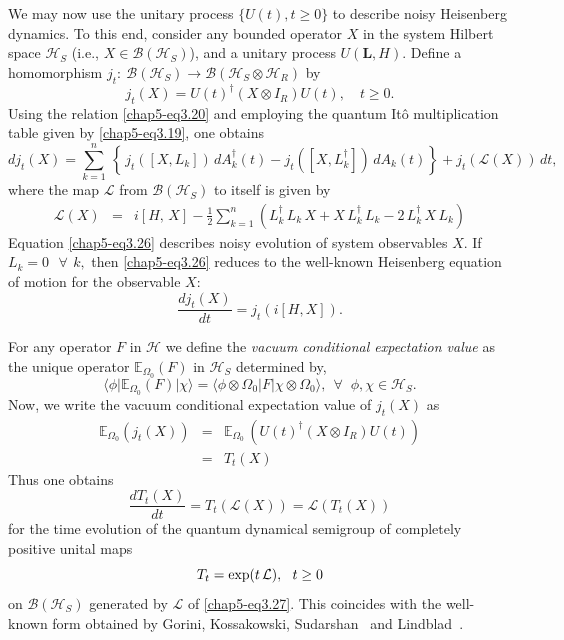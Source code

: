 We may now use the unitary process $\{U(t), t\geq 0\}$ to describe  noisy Heisenberg dynamics. To this end, consider any bounded operator $X$ in the system Hilbert space $\mathcal{H}_S$ (i.e., $X\in \mathcal{B}(\mathcal{H}_S)$),  and a unitary process $U\!(\mathbf{L}, H)$. Define a homomorphism $j_t:  \ \mathcal{B}(\mathcal{H}_S)\longrightarrow 
\mathcal{B}(\mathcal{H}_S\otimes\mathcal{H}_R)$ by 
\begin{equation}
j_t (X) = U(t)^{\dagger} (X \otimes I_R)  U(t), \quad t \ge 0. \label{chap5-eq3.25}
\end{equation}
Using the relation \eqref{chap5-eq3.20} and employing the quantum It\^{o} multiplication table given by \eqref{chap5-eq3.19},  one obtains 
\begin{equation}
dj_t(X)= \sum_{k=1}^{n}\, \left\{\, j_t\left([X, L_k]\right)\, dA^\dag_k(t)  - j_t\left([X,L_k^\dag]\right)\, dA_k(t) \right\} +j_t\left(\mathcal{L}(X)\right)\, dt,   \label{chap5-eq3.26}
\end{equation}
where   the map $\mathcal{L}$  from $\mathcal{B}(\mathcal{H}_S)$ to itself is given by 
\begin{eqnarray}
\mathcal{L}(X)&=& i\left[ H,\,  X\right]- \frac{1}{2} \sum_{k=1}^{n}\left(L^\dag_k\, L_k\, X + X\, L^\dag_k\, L_k -2\, L^\dag_k\, X\, L_k\right)  \label{chap5-eq3.27}
\end{eqnarray} 
Equation \eqref{chap5-eq3.26} describes noisy evolution of system observables $X$. If  $L_{k}=0 \ \ \ \forall\ \,k,$ then \eqref{chap5-eq3.26} reduces to the well-known Heisenberg equation of motion for the observable $X$:
$$
\frac{d j_t (X)}{dt} = j_t (i [H,X]).
$$

For any operator $F$ in $\mathcal{H}$ we define the {\it vacuum conditional expectation value} as the unique operator $\mathbb{E}_{\Omega_0} (F)$ in $\mathcal{H}_S$ determined by,
\begin{equation} 
\langle \phi\vert \mathbb{E}_{\Omega_0} (F) \vert \chi\rangle= \langle \phi\otimes \Omega_0 |F| \chi \otimes \Omega_0\rangle,\ \ \forall\,\, \ \phi,\chi \in \mathcal{H}_S. \label{chap5-eq3.28}
\end{equation}
Now, we write the vacuum conditional expectation value of $j_t (X)$ as   
\begin{eqnarray}
\mathbb{E}_{\Omega_0} \left(j_t(X)\right)&=&\mathbb{E}_{\Omega_0}\, \left(U(t)^{\dagger} (X \otimes I_R)  U(t)\right)\nonumber \\ 
&=&T_t(X) \label{chap5-eq3.29}
\end{eqnarray} 
Thus one obtains 
\begin{equation}
\frac{d T_t (X)}{dt} = T_t (\mathcal{L}(X))=\mathcal{L}\left(T_t(X)\right) \label{chap5-eq3.30}
\end{equation} 
for the time evolution of the quantum dynamical semigroup of completely positive unital maps 
\begin{equation}
T_t={\rm exp}( t\, \mathcal{L}),\ \  t\geq 0 \label{chap5-eq3.31}
\end{equation}  
on $\mathcal{B}(\mathcal{H}_S)$ generated by  $\mathcal{L}$ of \eqref{chap5-eq3.27}.  This coincides with the well-known form obtained by Gorini, Kossakowski, Sudarshan~\cite{key1} and Lindblad~\cite{key2}.  


